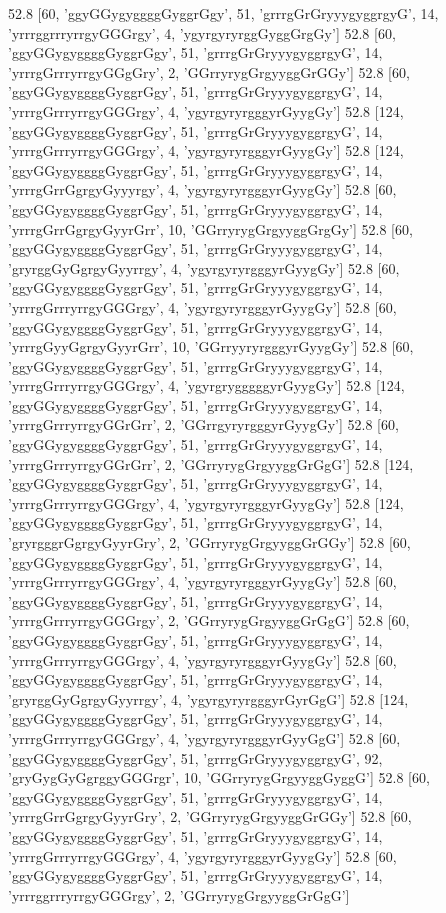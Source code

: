 52.8 [60, 'ggyGGygyggggGyggrGgy', 51, 'grrrgGrGryyygyggrgyG', 14, 'yrrrggrrryrrgyGGGrgy', 4, 'ygyrgyryrggGyggGrgGy']
52.8 [60, 'ggyGGygyggggGyggrGgy', 51, 'grrrgGrGryyygyggrgyG', 14, 'yrrrgGrrryrrgyGGgGry', 2, 'GGrryrygGrgyyggGrGGy']
52.8 [60, 'ggyGGygyggggGyggrGgy', 51, 'grrrgGrGryyygyggrgyG', 14, 'yrrrgGrrryrrgyGGGrgy', 4, 'ygyrgyryrgggyrGyygGy']
52.8 [124, 'ggyGGygyggggGyggrGgy', 51, 'grrrgGrGryyygyggrgyG', 14, 'yrrrgGrrryrrgyGGGrgy', 4, 'ygyrgyryrgggyrGyygGy']
52.8 [124, 'ggyGGygyggggGyggrGgy', 51, 'grrrgGrGryyygyggrgyG', 14, 'yrrrgGrrGgrgyGyyyrgy', 4, 'ygyrgyryrgggyrGyygGy']
52.8 [60, 'ggyGGygyggggGyggrGgy', 51, 'grrrgGrGryyygyggrgyG', 14, 'yrrrgGrrGgrgyGyyrGrr', 10, 'GGrryrygGrgyyggGrgGy']
52.8 [60, 'ggyGGygyggggGyggrGgy', 51, 'grrrgGrGryyygyggrgyG', 14, 'gryrggGyGgrgyGyyrrgy', 4, 'ygyrgyryrgggyrGyygGy']
52.8 [60, 'ggyGGygyggggGyggrGgy', 51, 'grrrgGrGryyygyggrgyG', 14, 'yrrrgGrrryrrgyGGGrgy', 4, 'ygyrgyryrgggyrGyygGy']
52.8 [60, 'ggyGGygyggggGyggrGgy', 51, 'grrrgGrGryyygyggrgyG', 14, 'yrrrgGyyGgrgyGyyrGrr', 10, 'GGrryyryrgggyrGyygGy']
52.8 [60, 'ggyGGygyggggGyggrGgy', 51, 'grrrgGrGryyygyggrgyG', 14, 'yrrrgGrrryrrgyGGGrgy', 4, 'ygyrgrygggggyrGyygGy']
52.8 [124, 'ggyGGygyggggGyggrGgy', 51, 'grrrgGrGryyygyggrgyG', 14, 'yrrrgGrrryrrgyGGrGrr', 2, 'GGrrgyryrgggyrGyygGy']
52.8 [60, 'ggyGGygyggggGyggrGgy', 51, 'grrrgGrGryyygyggrgyG', 14, 'yrrrgGrrryrrgyGGrGrr', 2, 'GGrryrygGrgyyggGrGgG']
52.8 [124, 'ggyGGygyggggGyggrGgy', 51, 'grrrgGrGryyygyggrgyG', 14, 'yrrrgGrrryrrgyGGGrgy', 4, 'ygyrgyryrgggyrGyygGy']
52.8 [124, 'ggyGGygyggggGyggrGgy', 51, 'grrrgGrGryyygyggrgyG', 14, 'gryrgggrGgrgyGyyrGry', 2, 'GGrryrygGrgyyggGrGGy']
52.8 [60, 'ggyGGygyggggGyggrGgy', 51, 'grrrgGrGryyygyggrgyG', 14, 'yrrrgGrrryrrgyGGGrgy', 4, 'ygyrgyryrgggyrGyygGy']
52.8 [60, 'ggyGGygyggggGyggrGgy', 51, 'grrrgGrGryyygyggrgyG', 14, 'yrrrgGrrryrrgyGGGrgy', 2, 'GGrryrygGrgyyggGrGgG']
52.8 [60, 'ggyGGygyggggGyggrGgy', 51, 'grrrgGrGryyygyggrgyG', 14, 'yrrrgGrrryrrgyGGGrgy', 4, 'ygyrgyryrgggyrGyygGy']
52.8 [60, 'ggyGGygyggggGyggrGgy', 51, 'grrrgGrGryyygyggrgyG', 14, 'gryrggGyGgrgyGyyrrgy', 4, 'ygyrgyryrgggyrGyrGgG']
52.8 [124, 'ggyGGygyggggGyggrGgy', 51, 'grrrgGrGryyygyggrgyG', 14, 'yrrrgGrrryrrgyGGGrgy', 4, 'ygyrgyryrgggyrGyyGgG']
52.8 [60, 'ggyGGygyggggGyggrGgy', 51, 'grrrgGrGryyygyggrgyG', 92, 'gryGygGyGgrggyGGGrgr', 10, 'GGrryrygGrgyyggGyggG']
52.8 [60, 'ggyGGygyggggGyggrGgy', 51, 'grrrgGrGryyygyggrgyG', 14, 'yrrrgGrrGgrgyGyyrGry', 2, 'GGrryrygGrgyyggGrGGy']
52.8 [60, 'ggyGGygyggggGyggrGgy', 51, 'grrrgGrGryyygyggrgyG', 14, 'yrrrgGrrryrrgyGGGrgy', 4, 'ygyrgyryrgggyrGyygGy']
52.8 [60, 'ggyGGygyggggGyggrGgy', 51, 'grrrgGrGryyygyggrgyG', 14, 'yrrrggrrryrrgyGGGrgy', 2, 'GGrryrygGrgyyggGrGgG']
